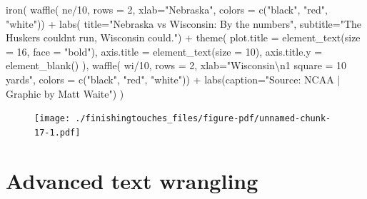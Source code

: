 \documentclass[
  letterpaper,
  DIV=11,
  numbers=noendperiod]{scrreprt}
\newenvironment{Shaded}{\begin{snugshade}}{\end{snugshade}}
\newcommand{\AttributeTok}[1]{\textcolor[rgb]{0.40,0.45,0.13}{#1}}
\newcommand{\DecValTok}[1]{\textcolor[rgb]{0.68,0.00,0.00}{#1}}
\newcommand{\FunctionTok}[1]{\textcolor[rgb]{0.28,0.35,0.67}{#1}}
\newcommand{\NormalTok}[1]{\textcolor[rgb]{0.00,0.23,0.31}{#1}}
\newcommand{\SpecialCharTok}[1]{\textcolor[rgb]{0.37,0.37,0.37}{#1}}
\newcommand{\StringTok}[1]{\textcolor[rgb]{0.13,0.47,0.30}{#1}}
\begin{document}
\begin{Shaded}
\begin{Highlighting}[]
\FunctionTok{iron}\NormalTok{(}
 \FunctionTok{waffle}\NormalTok{(}
\NormalTok{   ne}\SpecialCharTok{/}\DecValTok{10}\NormalTok{, }
   \AttributeTok{rows =} \DecValTok{2}\NormalTok{, }
   \AttributeTok{xlab=}\StringTok{"Nebraska"}\NormalTok{,}
   \AttributeTok{colors =} \FunctionTok{c}\NormalTok{(}\StringTok{"black"}\NormalTok{, }\StringTok{"red"}\NormalTok{, }\StringTok{"white"}\NormalTok{)) }\SpecialCharTok{+} 
   \FunctionTok{labs}\NormalTok{(}
     \AttributeTok{title=}\StringTok{"Nebraska vs Wisconsin: By the numbers"}\NormalTok{, }
     \AttributeTok{subtitle=}\StringTok{"The Huskers couldn\textquotesingle{}t run, Wisconsin could."}\NormalTok{) }\SpecialCharTok{+} 
   \FunctionTok{theme}\NormalTok{(}
    \AttributeTok{plot.title =} \FunctionTok{element\_text}\NormalTok{(}\AttributeTok{size =} \DecValTok{16}\NormalTok{, }\AttributeTok{face =} \StringTok{"bold"}\NormalTok{),}
    \AttributeTok{axis.title =} \FunctionTok{element\_text}\NormalTok{(}\AttributeTok{size =} \DecValTok{10}\NormalTok{),}
    \AttributeTok{axis.title.y =} \FunctionTok{element\_blank}\NormalTok{()}
\NormalTok{  ),}
 \FunctionTok{waffle}\NormalTok{(}
\NormalTok{   wi}\SpecialCharTok{/}\DecValTok{10}\NormalTok{, }
   \AttributeTok{rows =} \DecValTok{2}\NormalTok{, }
   \AttributeTok{xlab=}\StringTok{"Wisconsin}\SpecialCharTok{\textbackslash{}n}\StringTok{1 square = 10 yards"}\NormalTok{, }
   \AttributeTok{colors =} \FunctionTok{c}\NormalTok{(}\StringTok{"black"}\NormalTok{, }\StringTok{"red"}\NormalTok{, }\StringTok{"white"}\NormalTok{)) }\SpecialCharTok{+} 
   \FunctionTok{labs}\NormalTok{(}\AttributeTok{caption=}\StringTok{"Source: NCAA | Graphic by Matt Waite"}\NormalTok{)}
\NormalTok{) }
\end{Highlighting}
\end{Shaded}

\begin{figure}[H]

{\centering \texttt{[image: ./finishingtouches\_files/figure-pdf/unnamed-chunk-17-1.pdf]}

}

\end{figure}

\hypertarget{advanced-text-wrangling}{%
\section{Advanced text wrangling}\label{advanced-text-wrangling}}
\end{document}
